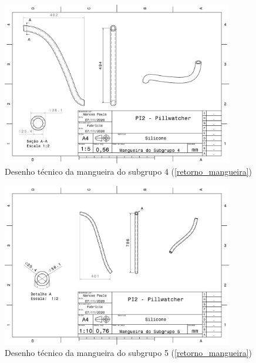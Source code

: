\begin{apendicesenv}
\begin{figure}[H]
    \centering
    \includegraphics[width=0.9\textwidth]{figuras/estrutura/Desenhos/S1C4.pdf}
    \caption{Desenho técnico da mangueira do subgrupo 4 (\ref{retorno_mangueira})}
    \label{fig:M_S4}
\end{figure}

\begin{figure}[H]
    \centering
    \includegraphics[width=0.9\textwidth]{figuras/estrutura/Desenhos/S1C5.pdf}
    \caption{Desenho técnico da mangueira do subgrupo 5 (\ref{retorno_mangueira})}
    \label{fig:M_S5}
\end{figure}


\end{apendicesenv}
